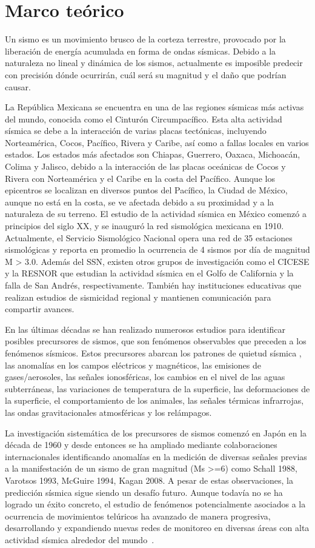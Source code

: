 
\section{Marco teórico}
Un sismo es un movimiento brusco de la corteza terrestre, provocado por la liberación de energía acumulada en forma de ondas sísmicas. Debido a la naturaleza no lineal y dinámica de los sismos, actualmente es imposible predecir con precisión dónde ocurrirán, cuál será su magnitud y el daño que podrían causar.

La República Mexicana se encuentra en una de las regiones sísmicas más activas del mundo, conocida como el Cinturón Circumpacífico. Esta alta actividad sísmica se debe a la interacción de varias placas tectónicas, incluyendo Norteamérica, Cocos, Pacífico, Rivera y Caribe, así como a fallas locales en varios estados. Los estados más afectados son Chiapas, Guerrero, Oaxaca, Michoacán, Colima y Jalisco, debido a la interacción de las placas oceánicas de Cocos y Rivera con Norteamérica y el Caribe en la costa del Pacífico. Aunque los epicentros se localizan en diversos puntos del Pacífico, la Ciudad de México, aunque no está en la costa, se ve afectada debido a su proximidad y a la naturaleza de su terreno. El estudio de la actividad sísmica en México comenzó a principios del siglo XX, y se inauguró la red sismológica mexicana en 1910. Actualmente, el Servicio Sismológico Nacional \cite{SSN} opera una red de 35 estaciones sismológicas y reporta en promedio la ocurrencia de 4 sismos por día de magnitud M > 3.0. Además del SSN, existen otros grupos de investigación como el CICESE y la RESNOR que estudian la actividad sísmica en el Golfo de California y la falla de San Andrés, respectivamente. También hay instituciones educativas que realizan estudios de sismicidad regional y mantienen comunicación para compartir avances.

En las últimas décadas se han realizado numerosos estudios para identificar posibles precursores de sismos, que son fenómenos observables que preceden a los fenómenos sísmicos. Estos precursores abarcan los patrones de quietud sísmica \cite{SSN}, las anomalías en los campos eléctricos y magnéticos, las emisiones de gases/aerosoles, las señales ionosféricas, los cambios en el nivel de las aguas subterráneas, las variaciones de temperatura de la superficie, las deformaciones de la superficie, el comportamiento de los animales, las señales térmicas infrarrojas, las ondas gravitacionales atmosféricas y los relámpagos. 

La investigación sistemática de los precursores de sismos comenzó en Japón en la década de 1960 y desde entonces se ha ampliado mediante colaboraciones internacionales identificando anomalías en la medición de diversas señales previas a la manifestación de un sismo de gran magnitud (Ms >=6) como Schall 1988, Varotsos 1993, McGuire 1994, Kagan 2008.
A pesar de estas observaciones, la predicción sísmica sigue siendo un desafío futuro. Aunque todavía no se ha logrado un éxito concreto, el estudio de fenómenos potencialmente asociados a la ocurrencia de movimientos telúricos ha avanzado de manera progresiva, desarrollando y expandiendo nuevas redes de monitoreo en diversas áreas con alta actividad sísmica alrededor del mundo~\cite{Bhardwaj2021}.
